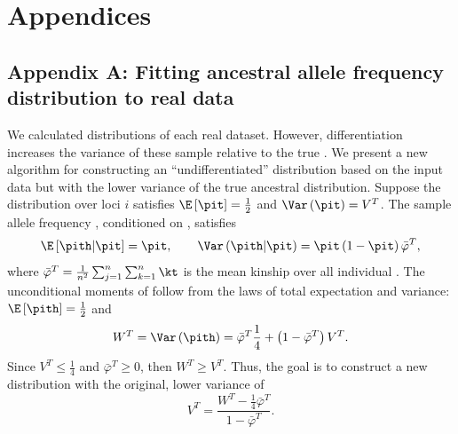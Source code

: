\documentclass[11pt]{article}
\begin{document}

\section{Appendices}

\subsection{Appendix A: Fitting ancestral allele frequency distribution to real data}

We calculated \pith distributions of each real dataset.
However, differentiation increases the variance of these sample \pith relative to the true \pit \citep{ochoa_estimating_2021}.
We present a new algorithm for constructing an ``undifferentiated'' distribution based on the input data but with the lower variance of the true ancestral distribution.
Suppose the \pit distribution over loci $i$ satisfies $\E \left[ \pit \right] = \frac{1}{2}$ and $\Var \left( \pit \right) = V^T$.
The sample allele frequency \pith, conditioned on \pit, satisfies
$$
\E \left[ \pith \middle| \pit \right]
=
\pit
, \quad\quad
\Var \left( \pith \middle| \pit \right)
=
\pit \left( 1 - \pit \right) \bar{\varphi}^T
,
$$
where $\bar{\varphi}^T = \frac{1}{n^2} \sum_{j=1}^n \sum_{k=1}^n \kt$ is the mean kinship over all individual \citep{ochoa_estimating_2021}.
The unconditional moments of \pith follow from the laws of total expectation and variance: 
$
\E \left[ \pith \right]
=
\frac{1}{2}
$
and
\begin{equation*}
  W^T
  =
  \Var \left( \pith \right)
  =
  \bar{\varphi}^T \frac{1}{4}
  + \left( 1 - \bar{\varphi}^T \right) V^T
  .
\end{equation*}
Since $V^T \le \frac{1}{4}$ and $\bar{\varphi}^T \ge 0$, then $W^T \ge V^T$.
Thus, the goal is to construct a new distribution with the original, lower variance of
\begin{equation}
  \label{eq:var_undiff}
  V^T
  =
  \frac{ W^T - \frac{1}{4} \bar{\varphi}^T }{ 1 - \bar{\varphi}^T }
  .
\end{equation}
\end{document}
